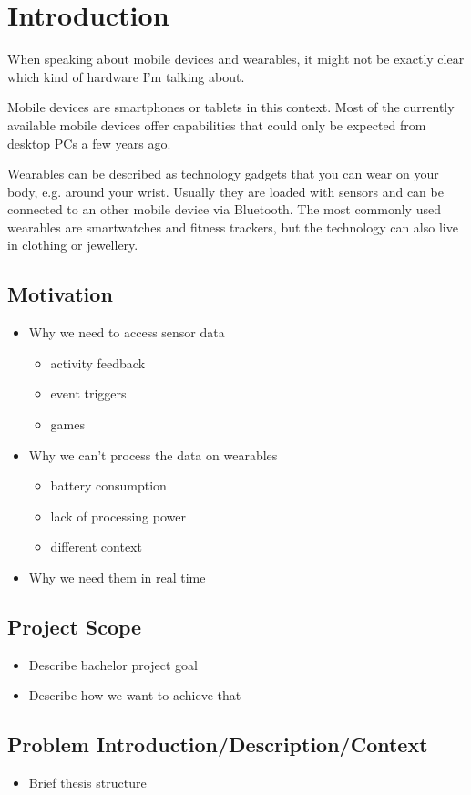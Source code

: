 \section{Introduction}
\label{sec:intro}

When speaking about mobile devices and wearables, it might not be exactly clear which kind of hardware I'm talking about.

Mobile devices are smartphones or tablets in this context. Most of the currently available mobile devices offer capabilities that could only be expected from desktop PCs a few years ago.

Wearables can be described as technology gadgets that you can wear on your body, e.g. around your wrist.
Usually they are loaded with sensors and can be connected to an other mobile device via Bluetooth.
The most commonly used wearables are smartwatches and fitness trackers, but the technology can also live in clothing or jewellery.


\subsection{Motivation}
\begin{itemize}[noitemsep]
	\item Why we need to access sensor data
		\begin{itemize}
			\item activity feedback
			\item event triggers
			\item games
		\end{itemize}
	\item Why we can't process the data on wearables
		\begin{itemize}
			\item battery consumption
			\item lack of processing power
			\item different context
		\end{itemize}
	\item Why we need them in real time
\end{itemize}
\lipsum[1]
\lipsum[2]


\subsection{Project Scope}
\begin{itemize}[noitemsep]
	\item Describe bachelor project goal
	\item Describe how we want to achieve that
\end{itemize}
\lipsum[1]
\lipsum[2]

\subsection{Problem Introduction/Description/Context}
\begin{itemize}[noitemsep]
	\item Brief thesis structure
\end{itemize}
\lipsum[1]



\clearpage